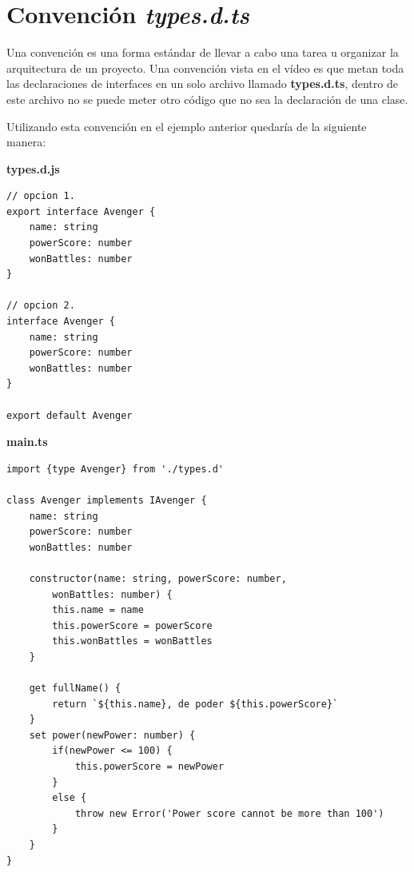 \section{Convención \textit{types.d.ts}}

Una convención es una forma estándar de llevar a cabo una tarea u organizar la arquitectura de un proyecto. Una convención vista en el vídeo es que metan toda las declaraciones de interfaces en un solo archivo llamado \textbf{types.d.ts}, dentro de este archivo no se puede meter otro código que no sea la declaración de una clase.

Utilizando esta convención en el ejemplo anterior quedaría de la siguiente manera:

\textbf{types.d.js}
\begin{lstlisting}
// opcion 1.
export interface Avenger {
    name: string
    powerScore: number
    wonBattles: number
}

// opcion 2.
interface Avenger {
    name: string
    powerScore: number
    wonBattles: number
}

export default Avenger
\end{lstlisting}

\textbf{main.ts}
\begin{lstlisting}
import {type Avenger} from './types.d'

class Avenger implements IAvenger {
    name: string
    powerScore: number
    wonBattles: number
    
    constructor(name: string, powerScore: number,
        wonBattles: number) {
        this.name = name
        this.powerScore = powerScore
        this.wonBattles = wonBattles
    }

    get fullName() {
        return `${this.name}, de poder ${this.powerScore}`
    }
    set power(newPower: number) {
        if(newPower <= 100) {
            this.powerScore = newPower
        }
        else {
            throw new Error('Power score cannot be more than 100')
        }
    }
}
\end{lstlisting}
